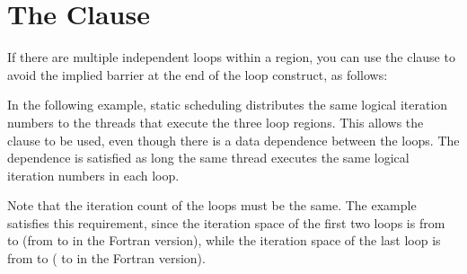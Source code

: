 \pagebreak
\chapter{The  Clause}
\label{chap:nowait}

If there are multiple independent loops within a  region, you 
can use the  clause to avoid the implied barrier at the end of the 
loop construct, as follows:



In the following example, static scheduling distributes the same logical iteration 
numbers to the threads that execute the three loop regions. This allows the  
clause to be used, even though there is a data dependence between the loops. The 
dependence is satisfied as long the same thread executes the same logical iteration 
numbers in each loop.

Note that the iteration count of the loops must be the same. The example satisfies 
this requirement, since the iteration space of the first two loops is from  
to  (from  to  in the Fortran version), while the 
iteration space of the last loop is from  to  ( to 
 in the Fortran version).



